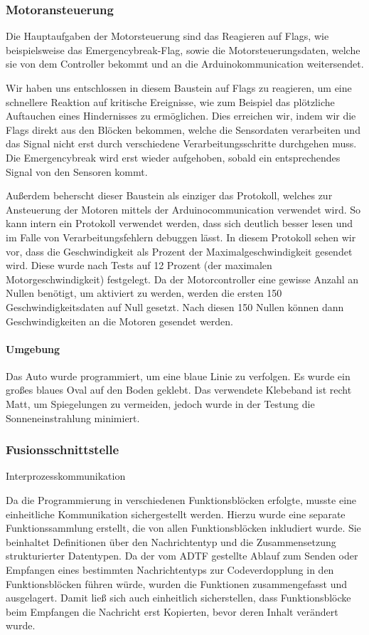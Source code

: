 \documentclass[12pt, a4paper]{scrartcl}
\begin{document}
\subsubsection{Motoransteuerung}
Die Hauptaufgaben der Motorsteuerung sind das Reagieren auf Flags, wie beispielsweise das Emergencybreak-Flag, sowie die Motorsteuerungsdaten, welche sie von dem Controller bekommt und an die Arduinokommunication weitersendet.

Wir haben uns entschlossen in diesem Baustein auf Flags zu reagieren, um eine schnellere Reaktion auf kritische Ereignisse, wie zum Beispiel das plötzliche Auftauchen eines Hindernisses zu ermöglichen. Dies erreichen wir, indem wir die Flags direkt aus den Blöcken bekommen, welche die Sensordaten verarbeiten und das Signal nicht erst durch verschiedene Verarbeitungsschritte durchgehen muss. Die Emergencybreak wird erst wieder aufgehoben, sobald ein entsprechendes Signal von den Sensoren kommt.

Außerdem beherscht dieser Baustein als einziger das Protokoll, welches zur Ansteuerung der Motoren mittels der Arduinocommunication verwendet wird. So kann intern ein Protokoll verwendet werden, dass sich deutlich besser lesen und im Falle von Verarbeitungsfehlern debuggen lässt. In diesem Protokoll sehen wir vor, dass die Geschwindigkeit als Prozent der Maximalgeschwindigkeit gesendet wird. Diese wurde nach Tests auf 12 Prozent (der maximalen Motorgeschwindigkeit) festgelegt. Da der Motorcontroller eine gewisse Anzahl an Nullen benötigt, um aktiviert zu werden, werden die ersten 150 Geschwindigkeitsdaten auf Null gesetzt. Nach diesen 150 Nullen können dann Geschwindigkeiten an die Motoren gesendet werden. 

\paragraph{Umgebung}
Das Auto wurde programmiert, um eine blaue Linie zu verfolgen. Es wurde ein großes blaues Oval auf den Boden geklebt. Das verwendete Klebeband ist recht Matt, um Spiegelungen zu vermeiden, jedoch wurde in der Testung die Sonneneinstrahlung minimiert.


\subsubsection{Fusionsschnittstelle}
Interprozesskommunikation

Da die Programmierung in verschiedenen Funktionsblöcken erfolgte, musste eine einheitliche Kommunikation sichergestellt werden. Hierzu wurde eine separate Funktionssammlung erstellt, die von allen Funktionsblöcken inkludiert wurde. Sie beinhaltet Definitionen über den Nachrichtentyp und die Zusammensetzung strukturierter Datentypen. Da der vom ADTF gestellte Ablauf zum Senden oder Empfangen eines bestimmten Nachrichtentyps zur Codeverdopplung in den Funktionsblöcken führen würde, wurden die Funktionen zusammengefasst und ausgelagert. Damit ließ sich auch einheitlich sicherstellen, dass Funktionsblöcke beim Empfangen die Nachricht erst Kopierten, bevor deren Inhalt verändert wurde.
\end{document}
